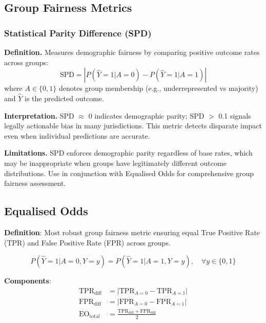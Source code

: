 \documentclass{article}
\begin{document}
\subsection{Group Fairness Metrics}

\subsubsection{Statistical Parity Difference (SPD)}

\textbf{Definition.} Measures demographic fairness by comparing positive outcome rates across groups:
\begin{equation}
\text{SPD} = \left| P(\hat{Y}=1|A=0) - P(\hat{Y}=1|A=1) \right|
\end{equation}
where $A \in \{0,1\}$ denotes group membership (e.g., underrepresented vs majority) and $\hat{Y}$ is the predicted outcome.

\textbf{Interpretation.} SPD $\approx$ 0 indicates demographic parity; SPD $>$ 0.1 signals legally actionable bias in many jurisdictions. This metric detects disparate impact even when individual predictions are accurate.

\textbf{Limitations.} SPD enforces demographic parity regardless of base rates, which may be inappropriate when groups have legitimately different outcome distributions. Use in conjunction with Equalised Odds for comprehensive group fairness assessment.

\subsection{Equalised Odds}

\textbf{Definition}: Most robust group fairness metric ensuring equal True Positive Rate (TPR) and False Positive Rate (FPR) across groups.

\begin{equation}
P(\hat{Y}=1|A=0,Y=y) = P(\hat{Y}=1|A=1,Y=y), \quad \forall y \in \{0,1\}
\end{equation}

\textbf{Components}:
\begin{align}
\text{TPR}_{\text{diff}} &= \left| \text{TPR}_{A=0} - \text{TPR}_{A=1} \right| \\
\text{FPR}_{\text{diff}} &= \left| \text{FPR}_{A=0} - \text{FPR}_{A=1} \right| \\
\text{EO}_{\text{total}} &= \frac{\text{TPR}_{\text{diff}} + \text{FPR}_{\text{diff}}}{2}
\end{align}
\end{document}
